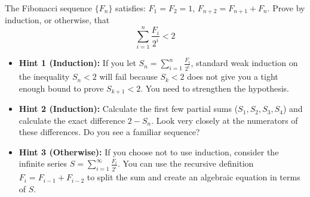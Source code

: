 \begin{problem}
The Fibonacci sequence $\{F_n\}$ satisfies: $F_1 = F_2 = 1$, $F_{n+2} = F_{n+1} + F_n$. Prove by induction, or otherwise, that
\[
\sum_{i=1}^n \frac{F_i}{2^i} < 2
\]
\end{problem}

\begin{hint}
\begin{itemize}[leftmargin=*]
    \item \textbf{Hint 1 (Induction):} If you let $S_n = \sum_{i=1}^n \frac{F_i}{2^i}$, standard weak induction on the inequality $S_n < 2$ will fail because $S_k < 2$ does not give you a tight enough bound to prove $S_{k+1} < 2$. You need to strengthen the hypothesis.
    \item \textbf{Hint 2 (Induction):} Calculate the first few partial sums ($S_1, S_2, S_3, S_4$) and calculate the exact difference $2 - S_n$. Look very closely at the numerators of these differences. Do you see a familiar sequence?
    \item \textbf{Hint 3 (Otherwise):} If you choose not to use induction, consider the infinite series $S = \sum_{i=1}^\infty \frac{F_i}{2^i}$. You can use the recursive definition $F_i = F_{i-1} + F_{i-2}$ to split the sum and create an algebraic equation in terms of $S$.
\end{itemize}
\end{hint}

